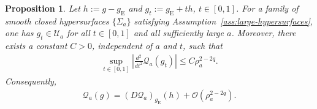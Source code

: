 \documentclass[10pt,a4paper]{amsart}
\newcommand{\gE}{g_{\mathrm{E}}}
\newtheorem{proposition}[theorem]{Proposition}
\begin{document}
	\begin{proposition}\label{prop:BY-uniform-quadratic-remainder}
		Let $h:=g-\gE$ and $g_t:=\gE+t h$, $t\in[0,1]$. For a family of smooth closed hypersurfaces $\{\Sigma_a\}$ satisfying Assumption~\ref{ass:large-hypersurfaces}, one has
		$g_t\in\mathcal U_a$ for all $t\in [0,1]$ and all sufficiently large $a$. Moreover, there exists a constant $C>0$, independent of $a$ and
		$t$, such that
		\begin{align}\label{eq:BY-uniform-quadratic-remainder}
			\sup_{t\in[0,1]}
			\left|
			\frac{d^2}{dt^2}\mathcal Q_a(g_t)
			\right|
			\leq
			C\rho_a^{2-2q}.
		\end{align}
		Consequently,
		\begin{align}\label{eq:BY-Qa-Taylor-without-regularity}
			\mathcal Q_a(g)
			=
			(D\mathcal Q_a)_{\gE}(h)
			+
			\mathcal O(\rho_a^{2-2q}).
		\end{align}
	\end{proposition}
	
\end{document}
